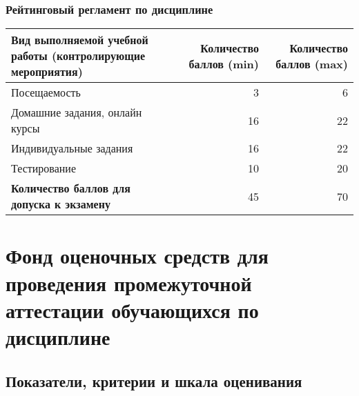 \documentclass[a4paper,12pt]{article}
\begin{document}
\subsubsection*{Рейтинговый регламент по дисциплине}
\begin{longtable}{|>{\raggedright\arraybackslash}p{110mm}|r|r|}
\hline
\centering\arraybackslash Вид выполняемой учебной работы (контролирующие мероприятия) & 
\multicolumn{1}{p{20mm}|}{\centering\arraybackslash Количество баллов (min)} & 
\multicolumn{1}{p{20mm}|}{\centering\arraybackslash Количество баллов (max)} \\
\hline
Посещаемость & 3 & 6 \\ 
\hline
Домашние задания, онлайн курсы & 16 & 22 \\ 
\hline
Индивидуальные задания & 16 & 22 \\ 
\hline
Тестирование & 10 & 20 \\ 
\hline
{\bf Количество баллов для допуска к экзамену} & 45 & 70 \\ 

\hline
\end{longtable}

\newpage

\section{Фонд оценочных средств для проведения промежуточной аттестации обучающихся по дисциплине}

\subsection{Показатели, критерии и шкала оценивания}
\end{document}
